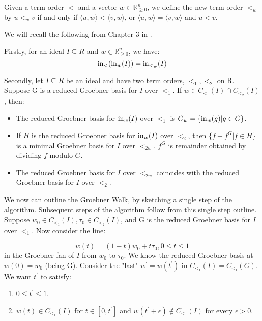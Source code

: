 \documentclass[12pt,a4paper]{report}
\begin{document}
Given a term order $<$ and a vector $w \in \mathbb{R}^{n} _{\geq 0}$, we define the new term order $<_{w}$ by $u <_{w} v$ if and only if $\langle u, w \rangle < \langle v, w \rangle$, or $\langle u, w \rangle = \langle v, w \rangle$ and $u < v$.


We will recall the following from Chapter 3 in \cite{GenericGroebner}.

Firstly, for an ideal $I \subseteq R$ and $w \in \mathbb{R}_{\geq 0}^{n}$, we have:
\begin{equation*}
    \operatorname{in}_{<} ( \operatorname{in}_{w} (I)) = \operatorname{in}_{{<}_{w}} (I)
\end{equation*}


Secondly, let $I \subseteq R$ be an ideal and have two term orders, $<_{1}, <_{2}$ on R. Suppose G is a reduced Groebner basis for $I$ over $<_{1}$. If $w \in C_{<_{1}} (I) \cap C_{<_{2}} (I)$, then:

\begin{itemize}
    \item The reduced Groebner basis for $\operatorname{in}_{w} (I)$ over $<_{1}$ is $G_{w} = \{ \operatorname{in}_{w} (g) | g \in G\}$.
    \item If $H$ is the reduced Groebner basis for $\operatorname{in}_{w} (I)$ over $<_{2}$, then $\{ f - f^{G} | f \in H \}$ is a minimal Groebner basis for $I$ over $<_{2w}$. $f^{G}$ is remainder obtained by dividing $f$ modulo $G$.
    \item The reduced Groebner basis for $I$ over $<_{2w}$ coincides with the reduced Groebner basis for $I$ over $<_{2}$.
\end{itemize}

We now can outline the Groebner Walk, by sketching a single step of the algorithm. Subsequent steps of the algorithm follow from this single step outline. Suppose $w_{0} \in C_{{<}_{1}} (I), \tau_{0} \in C_{{<}_{2}} (I)$, and G is the reduced Groebner basis for $I$ over $<_{1}$. Now consider the line:


\begin{equation*}
    w(t) = (1-t)w_{0} + t \tau_{0}, 0 \leq t \leq 1
\end{equation*}
in the Groebner fan of $I$ from $w_{0}$ to $\tau_{0}$. We know the reduced Groebner basis at $w(0) = w_{0}$ (being G). Consider the "last" $w^{'} = w(t^{'})$ in $C_{{<}_{1}} (I) = C_{{<}_{1}} (G)$. We want $t^{'}$ to satisfy:


\begin{enumerate}
    \item $0 \leq t^{'} \leq 1$.
    \item $w(t) \in C_{<_{1}} (I)$ for $t \in [0, t^{'}] $ and $ w(t^{'} + \epsilon) \notin C_{<_{1}} (I)$ for every $\epsilon > 0$.
\end{enumerate}
\end{document}
